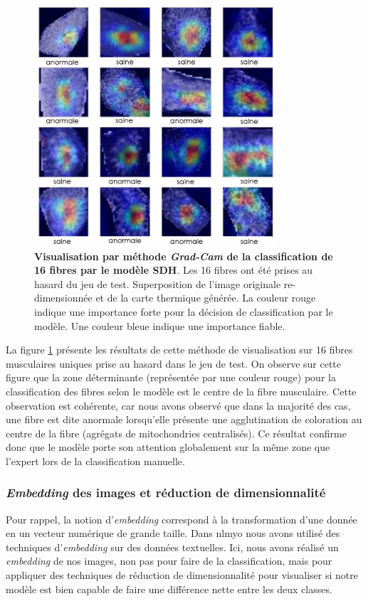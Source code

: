 \begin{figure}[!htbp]
 \centering
 \includegraphics[width=0.8\textwidth]{figures/sdh_gradcam.png}
 \caption[Visualisation par méthode \textit{Grad-Cam} du modèle SDH]{\textbf{Visualisation par méthode \textit{Grad-Cam} de la classification de 16 fibres par le modèle SDH}. Les 16 fibres ont été prises au hasard du jeu de test. Superposition de l'image originale re-dimensionnée et de la carte thermique générée. La couleur rouge indique une importance forte pour la décision de classification par le modèle. Une couleur bleue indique une importance fiable.}
 \label{fig:gradcam_sdh}
\end{figure}
La figure \ref{fig:gradcam_sdh} présente les résultats de cette méthode de visualisation sur 16 fibres musculaires uniques prise au hasard dans le jeu de test. On observe sur cette figure que la zone déterminante (représentée par une couleur rouge) pour la classification des fibres selon le modèle est le centre de la fibre musculaire. Cette observation est cohérente, car nous avons observé que dans la majorité des cas, une fibre est dite anormale lorsqu'elle présente une agglutination de coloration au centre de la fibre (agrégats de mitochondries centralisés). Ce résultat confirme donc que le modèle porte son attention globalement sur la même zone que l'expert lors de la classification manuelle. 

\subsubsection{\textit{Embedding} des images et réduction de dimensionnalité} 
Pour rappel, la notion d'\textit{embedding} correspond à la transformation d'une donnée en un vecteur numérique de grande taille. Dans \gls{nlmyo} nous avons utilisé des techniques d'\textit{embedding} sur des données textuelles. Ici, nous avons réalisé un \textit{embedding} de nos images, non pas pour faire de la classification, mais pour appliquer des techniques de réduction de dimensionnalité pour visualiser si notre modèle est bien capable de faire une différence nette entre les deux classes.

